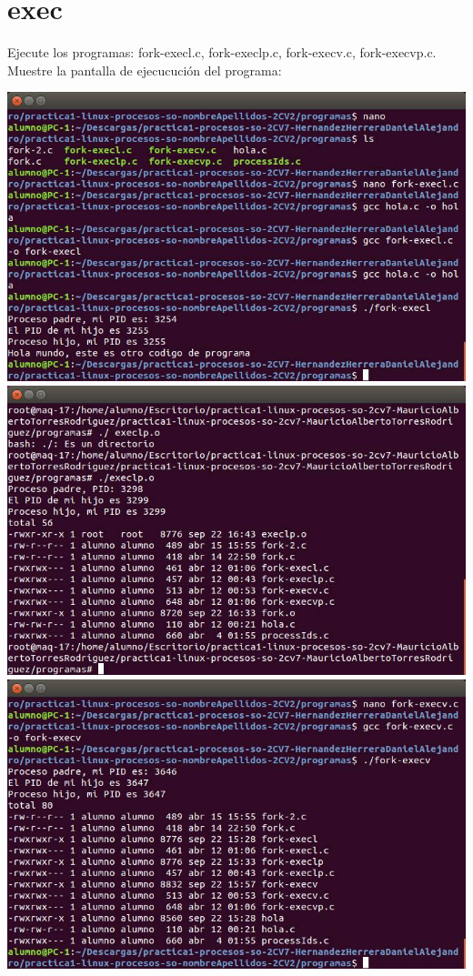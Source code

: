 \section{exec}

	Ejecute los programas: fork-execl.c, fork-execlp.c, fork-execv.c, fork-execvp.c. Muestre la pantalla de ejecucución del programa:

	\begin{center}
		\includegraphics[width=\linewidth]{imagenes/execl.png}
		\includegraphics[width=\linewidth]{imagenes/execlp.png}
		\includegraphics[width=\linewidth]{imagenes/execv.png}

\end{center}
